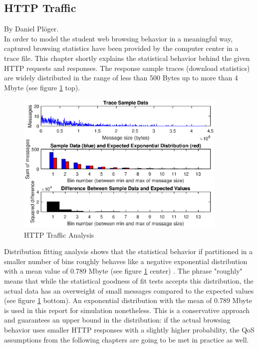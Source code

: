 \documentclass[a4paper,10pt]{book}\usepackage{graphicx}
\begin{document}
\subsection{HTTP Traffic}
\label{chapter_http_traffic}
By Daniel Plöger.\\

In order to model the student web browsing behavior in 
a meaningful way, captured browsing statistics have been provided by the computer center in a trace file. 
This chapter shortly explains the statistical behavior behind the given HTTP 
requests and responses. The response sample traces (download statistics) are widely 
distributed in the range of less than 500 Bytes up to more than 4 Mbyte 
(see figure \ref{fig:trace} top).
\begin{figure}[!ht]
  \begin{center}
    \includegraphics[width=0.9\textwidth]{trace_distribution.eps}
    \caption{HTTP Traffic Analysis}
    \label{fig:trace}
    \end{center}
\end{figure}

Distribution fitting analysis shows that the statistical behavior if
 partitioned in a smaller number of bins roughly behaves like a negative 
exponential distribution with a mean value of 0.789 Mbyte (see figure \ref{fig:trace} center) \cite{goodness_of_fit}. 
The phrase "roughly" means that while the statistical goodness of fit tests accepts
 this distribution, the actual data has an overweight of small messages compared to
 the expected values (see figure \ref{fig:trace} bottom). An exponential distribution with the
 mean of 0.789 Mbyte is used in this report for simulation nonetheless. 
This is a conservative approach and guarantees an upper bound in the distribution:
 if the actual browsing behavior uses smaller HTTP responses with a slightly higher
 probability, the QoS assumptions from the following chapters are going to be met 
in practice as well.
\end{document}
